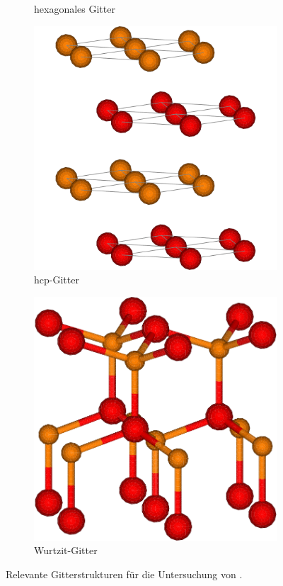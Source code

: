 \begin{figure}
\begin{subfigure}[t]{0.3\textwidth}
        \caption{hexagonales Gitter} \label{hex}
    \end{subfigure}
    \begin{subfigure}[t]{0.3\textwidth}
        \centering
        \includegraphics[width=\textwidth]{../assets/theorie/hcp}
        \caption{hcp-Gitter} \label{hcp}
    \end{subfigure}
    \begin{subfigure}[t]{0.3\textwidth}
        \centering
        \includegraphics[width=\textwidth]{../assets/theorie/wurzite}
        \caption{Wurtzit-Gitter} \label{wurtzit}
    \end{subfigure}
    \caption{Relevante Gitterstrukturen für die Untersuchung von \heo.} \label{fig:gitterstrukturen}
\end{figure}

